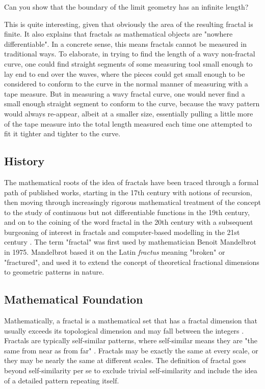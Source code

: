 \documentclass[article,A4,12pt]{llncs}
\begin{document}
\noindent
Can you show that the boundary of the limit geometry has an infinite length?

\newpage

\noindent
This is quite interesting, given that obviously the area of the resulting fractal is finite.
It also explains that fractals 
as mathematical objects are "nowhere differentiable". In a concrete sense, this means 
fractals cannot be measured in traditional ways. To elaborate, in trying to find the length 
of a wavy non-fractal curve, one could find straight segments of some measuring tool small 
enough to lay end to end over the waves, where the pieces could get small enough to be considered 
to conform to the curve in the normal manner of measuring with a tape measure. But in measuring a 
wavy fractal curve, one would never find a small enough straight segment to conform to the curve, 
because the wavy pattern would always re-appear, albeit at a smaller size, essentially pulling 
a little more of the tape measure into the total length measured each time one attempted to 
fit it tighter and tighter to the curve. 

\subsection*{History}

The mathematical roots of the idea of fractals have been traced through a formal path of published 
works, starting in the 17th century with notions of recursion, then moving through increasingly 
rigorous mathematical treatment of the concept to the study of continuous but not differentiable 
functions in the 19th century, and on to the coining of the word fractal in the 20th century 
with a subsequent burgeoning of interest in fractals and computer-based modelling in the 21st 
century \cite{f4,f5}. The term "fractal" was first used by mathematician Benoit Mandelbrot in 
1975. Mandelbrot based it on the Latin {\em fractus} meaning "broken" or "fractured", and used 
it to extend the concept of theoretical fractional dimensions to geometric patterns in nature.

\subsection*{Mathematical Foundation}

Mathematically, a fractal is a mathematical set that has a fractal dimension that usually exceeds its topological 
dimension \cite{f1} and may fall between the integers \cite{f2}. Fractals are typically self-similar 
patterns, where self-similar means they are "the same from near as from far" \cite{f3}. Fractals may 
be exactly the same at every scale, or they may be nearly the same at different scales. The 
definition of fractal goes beyond self-similarity per se to exclude trivial self-similarity and 
include the idea of a detailed pattern repeating itself. 
\end{document}
